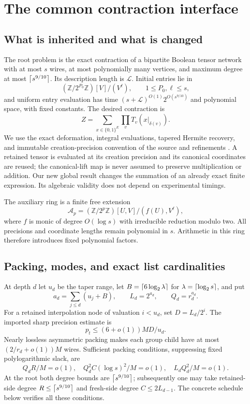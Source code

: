 \section{The common contraction interface}
\label{sec:interface}

\subsection{What is inherited and what is changed}
The root problem is the exact contraction of a bipartite Boolean tensor
network with at most $s$ wires, at most polynomially many vertices, and
maximum degree at most $\left\lceil s^{9/10}\right\rceil$. Its description length is
$\mathcal L$. Initial entries lie in
\[
 (\mathbb Z/2^{P_0}\mathbb Z)[V]/(V^\ell),\qquad 1\le P_0,\ell\le s,
\]
and uniform entry evaluation has time
$(s+\mathcal L)^{O(1)}2^{O(s^{9/10})}$ and polynomial space, with fixed
constants. The desired contraction is
\[
 Z=\sum_{x\in\{0,1\}^{E}}\prod_v T_v(x|_{\delta(v)}).
\]
We use the exact deformation, integral evaluations, tapered Hermite recovery,
and immutable creation-precision convention of the source and refinements
\cite{openai,asymmetric,joint,flags,treecert}. A retained tensor is evaluated
at its creation precision and its canonical coordinates are reused; the
canonical-lift map is never assumed to preserve multiplication or addition.
Our new global result changes the summation of an already exact finite
expression. Its algebraic validity does not depend on experimental timings.

The auxiliary ring is a finite free extension
\[
 \mathcal A_p=(\mathbb Z/2^p\mathbb Z)[U,V]/(f(U),V^\ell),
\]
where $f$ is monic of degree $O(\log s)$ with irreducible reduction modulo
two. All precisions and coordinate lengths remain polynomial in $s$.
Arithmetic in this ring therefore introduces fixed polynomial factors.

\subsection{Packing, modes, and exact list cardinalities}
At depth $d$ let $u_d$ be the taper range, let
$B=\left\lceil6\log_2\lambda\right\rceil$ for $\lambda=\left\lceil\log_2s\right\rceil$, and put
\[
 a_d=\sum_{j\le d}(u_j+B),\qquad L_d=2^{a_d},\qquad Q_d=r_d^{a_d}.
\]
For a retained interpolation node of valuation $i<u_d$, set
$D=L_d/2^i$. The imported sharp precision estimate is
\begin{equation}\label{eq:precision}
 p_t\le(6+o(1))MD/u_d.
\end{equation}
Nearly lossless asymmetric packing makes each group child have at most
$(2/r_d+o(1))M$ wires. Sufficient packing conditions, suppressing fixed
polylogarithmic slack, are
\begin{equation}\label{eq:packing}
 Q_dR/M=o(1),\quad Q_d^2C(\log s)^2/M=o(1),\quad
 L_dQ_d^2/M=o(1).
\end{equation}
At the root both degree bounds are $\left\lceil s^{9/10}\right\rceil$; subsequently one may
take retained-side degree $R\le\left\lceil s^{9/10}\right\rceil$ and fresh-side degree
$C\le 2L_{d-1}$. The concrete schedule below verifies all these conditions.

